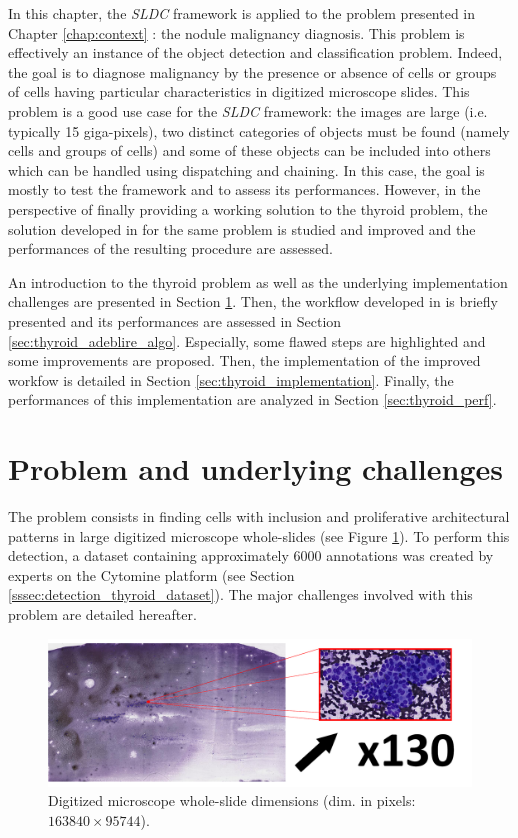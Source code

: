 \label{chap:thyroid}
In this chapter, the \textit{SLDC} framework is applied to the problem presented in Chapter \ref{chap:context} : the nodule malignancy diagnosis. This problem is effectively an instance of the object detection and classification problem. Indeed, the goal is to diagnose malignancy by the presence or absence of cells or groups of cells having particular characteristics in digitized microscope slides. This problem is a good use case for the \textit{SLDC} framework: the images are large (i.e. typically 15 giga-pixels), two distinct categories of objects must be found (namely cells and groups of cells) and some of these objects can be included into others which can be handled using dispatching and chaining. In this case, the goal is mostly to test the framework and to assess its performances. However, in the perspective of finally providing a working solution to the thyroid problem, the solution developed in \cite{adeblire2013} for the same problem is studied and improved and the performances of the resulting procedure are assessed.  

An introduction to the thyroid problem as well as the underlying implementation challenges are presented in Section \ref{sec:thyroid_impl_issue}. Then, the workflow developed in \cite{adeblire2013} is briefly presented and its performances are assessed in Section \ref{sec:thyroid_adeblire_algo}. Especially, some flawed steps are highlighted and some improvements are proposed. Then, the implementation of the improved workfow is detailed in Section \ref{sec:thyroid_implementation}. Finally, the performances of this implementation are analyzed in Section \ref{sec:thyroid_perf}.

\section{Problem and underlying challenges}
\label{sec:thyroid_impl_issue}
The problem consists in finding cells with inclusion and proliferative architectural patterns in large digitized microscope whole-slides (see Figure \ref{fig:whole_slide_illus}). To perform this detection, a dataset containing approximately 6000 annotations was created by experts on the Cytomine platform (see Section \ref{sssec:detection_thyroid_dataset}). The major challenges involved with this problem are detailed hereafter. 

\begin{figure}
	\center
	\includegraphics[scale=0.2]{image/whole-slide-dim.png}
	\caption{Digitized microscope whole-slide dimensions (dim. in pixels: $163840 \times 95744$).}
	\label{fig:whole_slide_illus}
\end{figure}

